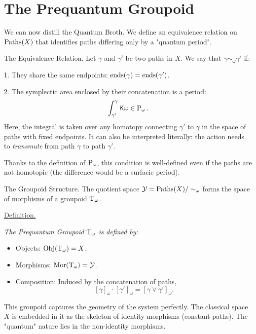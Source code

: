 \section{The Prequantum Groupoid}

We can now distill the Quantum Broth.
We define an equivalence relation on $\operatorname{Paths}(X)$ that identifies paths differing only by a "quantum period".

\begin{Article}{The Equivalence Relation.}{}
  Let $\gamma$ and $\gamma'$ be two paths in $X$.
  We say that $\gamma \sim_\omega \gamma'$ if:

  1. They share the same endpoints: $\operatorname{ends}(\gamma) = \operatorname{ends}(\gamma')$.

  2. The symplectic area enclosed by their concatenation is a period:
  $$%
    \int_{\gamma'}^\gamma \Komega \in \Periods_\omega.
  $$%
  Here,
  the integral is taken over any homotopy connecting $\gamma'$ to $\gamma$ in the space of paths with fixed endpoints.
  It can also be interpreted literally: the action needs to \emph{transmute} from path $\gamma$ to path $\gamma'$.

  Thanks to the definition of $\operatorname{P}_\omega$,
  this condition is well-defined even if the paths are not homotopic (the difference would be a surfacic period).
\end{Article}

\begin{Article}{The Groupoid Structure.}{}
  The quotient space $\mathcal{Y} = \operatorname{Paths}(X) / \sim_\omega$ forms the space of morphisms of a groupoid $\mathrm{T}_\omega$.

  \uline{Definition.} {\itshape The \emph{Prequantum Groupoid} $\mathrm{T}_\omega$ is defined by:
  \begin{itemize}
    \item Objects: ${\operatorname{Obj}}(\mathrm{T}_\omega) = X$.
    \item Morphisms: ${\operatorname{Mor}}(\mathrm{T}_\omega) = \mathcal{Y}$.
    \item Composition: Induced by the concatenation of paths,
    $$%
    [\gamma]_\omega \cdot [\gamma']_\omega = [\gamma \vee \gamma']_\omega.
    $$%
  \end{itemize}
  }

  This groupoid captures the geometry of the system perfectly.
  The classical space $X$ is embedded in it as the skeleton of identity morphisms (constant paths).
  The "quantum" nature lies in the non-identity morphisms.
\end{Article}

